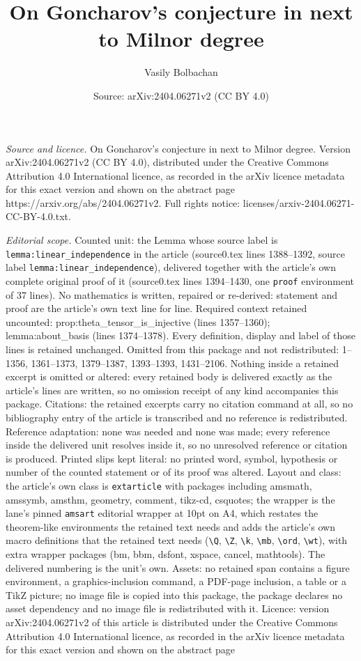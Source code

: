 \documentclass[10pt,a4paper]{amsart}
\title[On Goncharov's conjecture in next to Milnor degree]{On Goncharov's conjecture in next to Milnor degree}
\author{Vasily Bolbachan}
\date{Source: arXiv:2404.06271v2 (CC BY 4.0)}
\begin{document}
\maketitle

\noindent\emph{Source and licence.} On Goncharov's conjecture in next to Milnor degree. Version arXiv:2404.06271v2 (CC BY 4.0), distributed under the Creative Commons Attribution 4.0 International licence, as recorded in the arXiv licence metadata for this exact version and shown on the abstract page https://arxiv.org/abs/2404.06271v2. Full rights notice: licenses/arxiv-2404.06271-CC-BY-4.0.txt.\par\smallskip

\noindent\textit{Editorial scope.} Counted unit: the Lemma whose source label is \texttt{lemma:linear\_independence} in the article (source0.tex lines 1388--1392, source label \texttt{lemma:linear\_independence}), delivered together with the article's own complete original proof of it (source0.tex lines 1394--1430, one \texttt{proof} environment of 37 lines). No mathematics is written, repaired or re-derived: statement and proof are the article's own text line for line. Required context retained uncounted: prop:theta\_tensor\_is\_injective (lines 1357--1360); lemma:about\_basis (lines 1374--1378). Every definition, display and label of those lines is retained unchanged. Omitted from this package and not redistributed: 1--1356, 1361--1373, 1379--1387, 1393--1393, 1431--2106. Nothing inside a retained excerpt is omitted or altered: every retained body is delivered exactly as the article's lines are written, so no omission receipt of any kind accompanies this package. Citations: the retained excerpts carry no citation command at all, so no bibliography entry of the article is transcribed and no reference is redistributed. Reference adaptation: none was needed and none was made; every reference inside the delivered unit resolves inside it, so no unresolved reference or citation is produced. Printed slips kept literal: no printed word, symbol, hypothesis or number of the counted statement or of its proof was altered. Layout and class: the article's own class is \texttt{extarticle} with packages including amsmath, amssymb, amsthm, geometry, comment, tikz-cd, csquotes; the wrapper is the lane's pinned \texttt{amsart} editorial wrapper at 10pt on A4, which restates the theorem-like environments the retained text needs and adds the article's own macro definitions that the retained text needs (\texttt{\textbackslash Q}, \texttt{\textbackslash Z}, \texttt{\textbackslash k}, \texttt{\textbackslash mb}, \texttt{\textbackslash ord}, \texttt{\textbackslash wt}), with extra wrapper packages (bm, bbm, dsfont, xspace, cancel, mathtools). The delivered numbering is the unit's own. Assets: no retained span contains a figure environment, a graphics-inclusion command, a PDF-page inclusion, a table or a TikZ picture; no image file is copied into this package, the package declares no asset dependency and no image file is redistributed with it. Licence: version arXiv:2404.06271v2 of this article is distributed under the Creative Commons Attribution 4.0 International licence, as recorded in the arXiv licence metadata for this exact version and shown on the abstract page 
\end{document}

